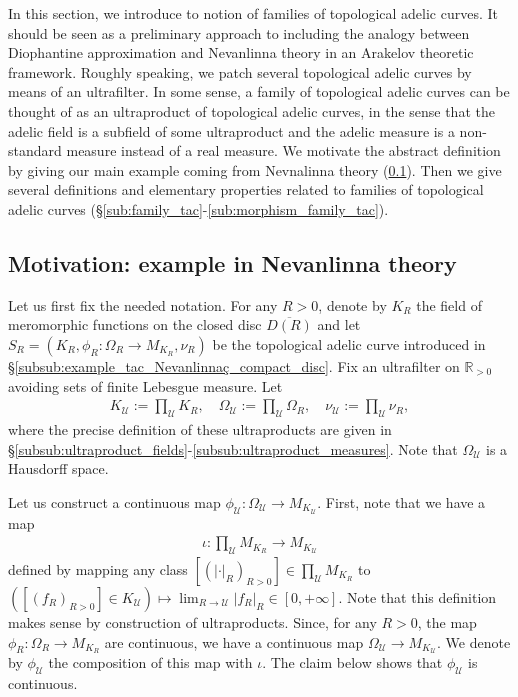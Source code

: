 \documentclass [11pt,reqno]{amsart}
\def\bR{{\mathbb{R}}}
\newcommand{\1}{\mathmybb{1}}
\def\cU{{\mathcal{U}}}
\begin{document}
In this section, we introduce to notion of families of topological adelic curves. It should be seen as a preliminary approach to including the analogy between Diophantine approximation and Nevanlinna theory in an Arakelov theoretic framework. Roughly speaking, we patch several topological adelic curves by means of an ultrafilter. In some sense, a family of topological adelic curves can be thought of as an ultraproduct of topological adelic curves, in the sense that the adelic field is a subfield of some ultraproduct and the adelic measure is a non-standard measure instead of a real measure. We motivate the abstract definition by giving our main example coming from Nevnalinna theory (\ref{sub:motivation_families}). Then we give several definitions and elementary properties related to families of topological adelic curves (\S \ref{sub:family_tac}-\ref{sub:morphism_family_tac}).

\subsection{Motivation: example in Nevanlinna theory}
\label{sub:motivation_families}

Let us first fix the needed notation. For any $R>0$, denote by $K_{R}$ the field of meromorphic functions on the closed disc $\overline{D(R)}$ and let $S_{R}=(K_{R},\phi_{R}:\Omega_{R}\to M_{K_{R}},\nu_{R})$ be the topological adelic curve introduced in \S \ref{subsub:example_tac_Nevanlinnaç_compact_disc}. Fix an ultrafilter on $\bR_{>0}$ avoiding sets of finite Lebesgue measure. Let
\begin{align*}
K_{\cU} := \displaystyle\prod_{\cU}K_{R}, \quad \Omega_{\cU} := \prod_{\cU}\Omega_{R}, \quad \nu_{\cU} := \prod_{\cU}\nu_{R},
\end{align*}
where the precise definition of these ultraproducts are given in \S \ref{subsub:ultraproduct_fields}-\ref{subsub:ultraproduct_measures}. Note that $\Omega_{\cU}$ is a Hausdorff space.

Let us construct a continuous map $\phi_{\cU} : \Omega_{\cU}\to M_{K_{\cU}}$. First, note that we have a map 
\begin{align*}
\iota : \prod_{\cU}M_{K_{R}} \to M_{K_{\cU}}
\end{align*}
defined by mapping any class $[(|\cdot|_{R})_{R>0}]\in\prod_{\cU}M_{K_{R}}$ to $([(f_{R})_{R>0}]\in K_{\cU}) \mapsto \lim_{R\to\cU}|f_{R}|_{R} \in [0,+\infty]$. Note that this definition makes sense by construction of ultraproducts. Since, for any $R>0$, the map $\phi_{R}:\Omega_{R}\to M_{K_{R}}$ are continuous, we have a continuous map $\Omega_{\cU}\to M_{K_{\cU}}$. We denote by $\phi_{\cU}$ the composition of this map with $\iota$. The claim below shows that $\phi_{\cU}$ is continuous.
\end{document}
